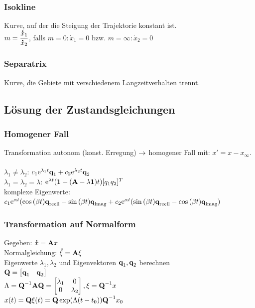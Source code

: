 \documentclass[fs, footer]{latex4ei}
\begin{document}
\begin{multicols*}{4}
    \subsubsection{Isokline}
    Kurve, auf der die Steigung der Trajektorie konstant ist.\\
    $m = \dfrac {\accentset{\mbox{\textrm{\large\bfseries .}} }{x}_1}{\accentset{\mbox{\textrm{\large\bfseries .}} }{x}_2}$, falls $m = 0: \dot x_1 = 0$ bzw. $m = \infty: \dot x_2 = 0$
    \subsubsection{Separatrix}
    Kurve, die Gebiete mit verschiedenem Langzeitverhalten trennt.
    \subsection{Lösung der Zustandsgleichungen}
    \subsubsection{Homogener Fall}
    Transformation autonom (konst. Erregung) $\rightarrow$ homogener Fall mit: $x' = x - x_\infty$.\\ \\
    $\lambda_1 \neq \lambda_2$: $c_1\mathrm{e}^{\lambda_1t}\textbf{q}_1 + c_2\mathrm{e}^{\lambda_2t}\textbf{q}_2$\\
    $\lambda_1 = \lambda_2 = \lambda$: $\mathrm{e}^{\lambda t}(\textbf{1} + (\textbf{A} -\lambda \textbf{1})t) [q_1 q_2]^T$\\
    komplexe Eigenwerte: $c_1 \mathrm{e}^{\alpha t}(\cos{(\beta t)}\textbf{q}_{\text{reell}} - \sin{(\beta t)}\textbf{q}_{\text{imag}} + c_2\mathrm{e}^{\alpha t}(\sin{(\beta t)}\textbf{q}_{\text{reell}} - \cos{(\beta t)}\textbf{q}_{\text{imag}})$\\
    \subsubsection{Transformation auf Normalform}
    Gegeben: $\accentset{\mbox{\textrm{\large\bfseries .}} }{x} = \textbf{A} x$\\
    Normalgleichung: $\accentset{\mbox{\textrm{\large\bfseries .}} }{\xi} = \textbf{A}\xi$\\
    Eigenwerte $\lambda_1, \lambda_2$ und Eigenvektoren $\textbf{q}_1, \textbf{q}_2$ berechnen\\
    $\textbf{Q} =  \begin{bmatrix} \textbf{q}_1 & \textbf{q}_2  \end{bmatrix}$\\
    $\Lambda = \textbf{Q}^{-1}\textbf{A}\textbf{Q} = \begin{bmatrix} \lambda_1 & 0 \\ 0 & \lambda_2  \end{bmatrix}, \xi = \textbf{Q}^{-1} x$\\
    $x(t) = \textbf{Q} \xi(t) = \textbf{Q} \exp(\Lambda(t-t_0))\textbf{Q}^{-1} x_0$\\

\end{multicols*}
\end{document}
